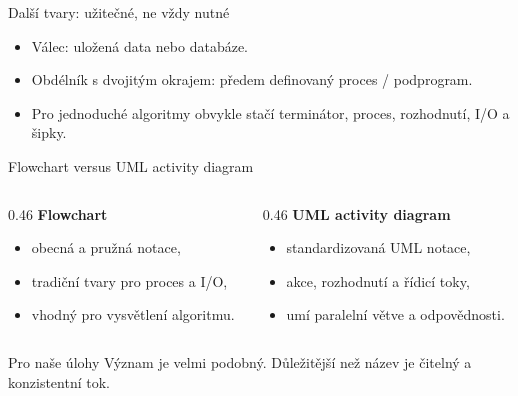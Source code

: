 \documentclass[aspectratio=169]{beamer}
\begin{document}
\begin{frame}{Další tvary: užitečné, ne vždy nutné}
  \centering
  \vspace{7mm}
  \begin{itemize}
    \item Válec: uložená data nebo databáze.
    \item Obdélník s dvojitým okrajem: předem definovaný proces / podprogram.
    \item Pro jednoduché algoritmy obvykle stačí terminátor, proces, rozhodnutí, I/O a šipky.
  \end{itemize}
\end{frame}

\begin{frame}{Flowchart versus UML activity diagram}
  \begin{columns}[T]
    \begin{column}{0.46\textwidth}
      \textbf{Flowchart}
      \begin{itemize}
        \item obecná a pružná notace,
        \item tradiční tvary pro proces a I/O,
        \item vhodný pro vysvětlení algoritmu.
      \end{itemize}
    \end{column}
    \begin{column}{0.46\textwidth}
      \textbf{UML activity diagram}
      \begin{itemize}
        \item standardizovaná UML notace,
        \item akce, rozhodnutí a řídicí toky,
        \item umí paralelní větve a odpovědnosti.
      \end{itemize}
    \end{column}
  \end{columns}
  \begin{block}{Pro naše úlohy}
    Význam je velmi podobný. Důležitější než název je čitelný a konzistentní tok.
  \end{block}
\end{frame}
\end{document}
